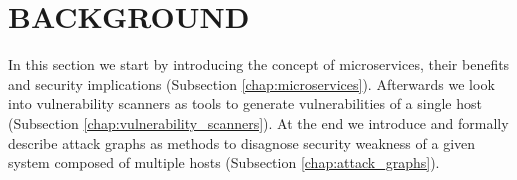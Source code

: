 \section{BACKGROUND}

In this section we start by introducing the concept of microservices, their benefits and security implications (Subsection \ref{chap:microservices}). Afterwards we look into vulnerability scanners as tools to generate vulnerabilities of a single host (Subsection \ref{chap:vulnerability_scanners}). At the end we introduce and formally describe attack graphs as methods to disagnose security weakness of a given system composed of multiple hosts (Subsection \ref{chap:attack_graphs}).





